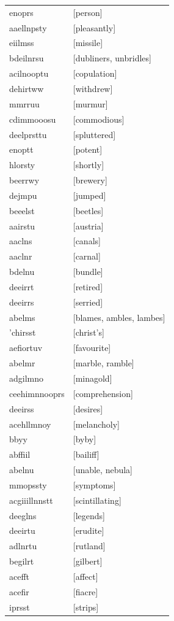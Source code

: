 \documentclass{article}
\begin{document}
\begin{tabular}{ll}
enoprs & [person] \\
aaellnpsty & [pleasantly] \\
eiilmss & [missile] \\
bdeilnrsu & [dubliners, unbridles] \\
acilnooptu & [copulation] \\
dehirtww & [withdrew] \\
mmrruu & [murmur] \\
cdimmooosu & [commodious] \\
deelprsttu & [spluttered] \\
enoptt & [potent] \\
hlorsty & [shortly] \\
beerrwy & [brewery] \\
dejmpu & [jumped] \\
beeelst & [beetles] \\
aairstu & [austria] \\
aaclns & [canals] \\
aaclnr & [carnal] \\
bdelnu & [bundle] \\
deeirrt & [retired] \\
deeirrs & [serried] \\
abelms & [blames, ambles, lambes] \\
'chirsst & [christ's] \\
aefiortuv & [favourite] \\
abelmr & [marble, ramble] \\
adgilmno & [minagold] \\
ceehimnnooprs & [comprehension] \\
deeirss & [desires] \\
acehllmnoy & [melancholy] \\
bbyy & [byby] \\
abffiil & [bailiff] \\
abelnu & [unable, nebula] \\
mmopssty & [symptoms] \\
acgiiillnnstt & [scintillating] \\
deeglns & [legends] \\
deeirtu & [erudite] \\
adlnrtu & [rutland] \\
begilrt & [gilbert] \\
acefft & [affect] \\
acefir & [fiacre] \\
iprsst & [strips] \\

\end{tabular}
\end{document}
